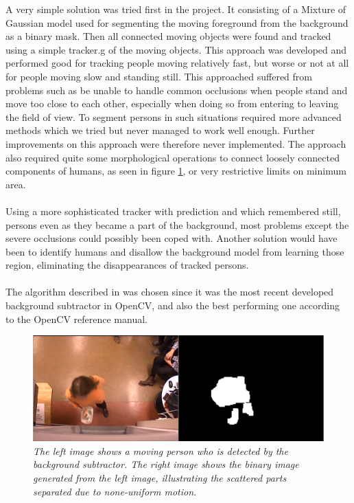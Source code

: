 
A very simple solution was tried first in the project. It consisting of a Mixture of Gaussian model\cite{Gardel} used for segmenting the moving foreground from the background as a binary mask. Then all connected moving objects were found and tracked using a simple tracker.g of the moving objects. This approach was developed and performed good for tracking people moving relatively fast, but worse or not at all for people moving slow and standing still. This approached suffered from problems such as be unable to handle common occlusions when people stand and move too close to each other, especially when doing so from entering to leaving the field of view. To segment persons in such situations required more advanced methods which we tried but never managed to work well enough. Further improvements on this approach were therefore never implemented. The approach also required quite some morphological operations to connect loosely connected components of humans, as seen in figure \ref{fig:bg_success}, or very restrictive limits on minimum area.\\
\\
Using a more sophisticated tracker with prediction and which remembered still, persons even as they became a part of the background, most problems except the severe occlusions could possibly been coped with. Another solution would have been to identify humans and disallow the background model from learning those region, eliminating the disappearances of tracked persons. \\
\\
The algorithm described in \cite{Gardel} was chosen since it was the most recent developed background subtractor in OpenCV, and also the best performing one according to the OpenCV reference manual. 

\vspace{1cm}
\begin{figure}[htb]
	\centering
	\includegraphics[width=\linewidth]{images/bg_success.png}
	\caption[An example of scattered binary mask of a human from the background model.]{\textit{The left image shows a moving person who is detected by the background subtractor. The right image shows the binary image generated from the left image, illustrating the scattered parts separated due to none-uniform motion.
	}}
	\label{fig:bg_success}  %
\end{figure}

